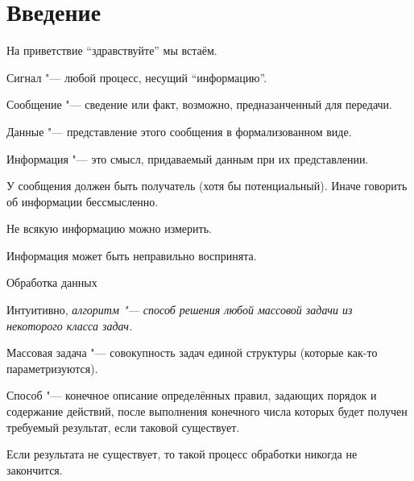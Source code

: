 \section{Введение}

\begin{note}
	На приветствие ``здравствуйте'' мы встаём.
\end{note}

\begin{definition}
	Сигнал "--- любой процесс, несущий ``информацию''.
\end{definition}

\begin{definition}
	Сообщение "--- сведение или факт, возможно, предназанченный для передачи.
\end{definition}

\begin{definition}
	Данные "--- представление этого сообщения в формализованном виде.
\end{definition}

\begin{definition}
	Информация "--- это смысл, придаваемый данным при их представлении.
\end{definition}

У сообщения должен быть получатель (хотя бы потенциальный). Иначе говорить об информации бессмысленно.

Не всякую информацию можно измерить.

Информация может быть неправильно воспринята.

\begin{definition}
	Обработка данных
\end{definition}

\begin{definition}
	Интуитивно, \it{алгоритм} "--- способ решения любой массовой задачи из некоторого класса задач.
\end{definition}

\begin{definition}
	Массовая задача "--- совокупность задач единой структуры (которые как-то параметризуются).
\end{definition}

\begin{definition}
	Способ "--- конечное описание определённых правил, задающих порядок и содержание действий, после выполнения конечного числа которых будет получен требуемый результат, если таковой существует.

	Если результата не существует, то такой процесс обработки никогда не закончится.
\end{definition}

